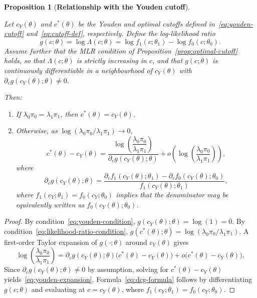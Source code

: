 \documentclass[11pt,a4paper]{article}
\newtheorem{proposition}[theorem]{Proposition}
\theoremstyle{definition}
\theoremstyle{remark}
\newcommand{\1}{\mathbf{1}}
\begin{document}
\begin{proposition}[\textbf{Relationship with the Youden cutoff}]
\label{prop:youden-relationship}

Let $c_Y(\theta)$ and $c^*(\theta)$ be the Youden and optimal
cutoffs defined in~\eqref{eq:youden-cutoff}
and~\eqref{eq:cutoff-def}, respectively.
Define the log-likelihood ratio
\[
g(c;\theta) = \log \Lambda(c;\theta)
= \log f_1(c;\theta_1) - \log f_0(c;\theta_0).
\]
Assume further that the MLR condition
of Proposition~\ref{prop:optimal-cutoff} holds, so that
$\Lambda(c;\theta)$ is strictly increasing in $c$, 
and that $g(c;\theta)$ is continuously differentiable in a
neighbourhood of $c_Y(\theta)$ with
$\partial_c g(c_Y(\theta);\theta) \neq 0$.

\noindent
Then:
\begin{enumerate}
  \item If $\lambda_0\pi_0 = \lambda_1\pi_1$, then
        $c^*(\theta) = c_Y(\theta)$.

  \item Otherwise, as
        $\log(\lambda_0\pi_0/\lambda_1\pi_1) \to 0$,
        \begin{equation}
        \label{eq:youden-expansion}
        c^*(\theta) - c_Y(\theta)
        =
        \frac{
          \log\!\left(\dfrac{\lambda_0\pi_0}{\lambda_1\pi_1}\right)
        }{
          \partial_c g(c_Y(\theta);\theta)
        }
        +
        o\!\left(
          \log \left(\!\frac{\lambda_0\pi_0}{\lambda_1\pi_1}\right)
        \right),
        \end{equation}
        where
        \begin{equation}
\label{eq:dcg-formula}
\partial_c g(c_Y(\theta);\theta)
= \frac{
    \partial_c f_1(c_Y(\theta);\theta_1)
    - \partial_c f_0(c_Y(\theta);\theta_0)
  }{
    f_1(c_Y(\theta);\theta_1)
  },
\end{equation}
where $f_1(c_Y;\theta_1) = f_0(c_Y;\theta_0)$ implies that the
denominator may be equivalently written as $f_0(c_Y(\theta);\theta_0)$.
\end{enumerate}
\end{proposition}

\begin{proof}
By condition~\eqref{eq:youden-condition}, $g(c_Y(\theta);\theta) = \log (1) = 0$. 
By condition~\eqref{eq:likelihood-ratio-condition},
$g(c^*(\theta);\theta) = \log(\lambda_0\pi_0/\lambda_1\pi_1)$.
A first-order Taylor expansion of $g(\cdot;\theta)$
around $c_Y(\theta)$ gives
\[
\log \left(\!\frac{\lambda_0\pi_0}{\lambda_1\pi_1}\right)
= \partial_c g(c_Y(\theta);\theta)
  \bigl(c^*(\theta) - c_Y(\theta)\bigr)
  + o\bigl(c^*(\theta) - c_Y(\theta)\bigr).
\]
Since $\partial_c g(c_Y(\theta);\theta) \neq 0$ by assumption,
solving for $c^*(\theta) - c_Y(\theta)$ yields~\eqref{eq:youden-expansion}.
Formula~\eqref{eq:dcg-formula} follows by differentiating
$g(c;\theta)$ and evaluating at $c = c_Y(\theta)$, where
$f_1(c_Y;\theta_1) = f_0(c_Y;\theta_0)$.
\end{proof}
\end{document}
